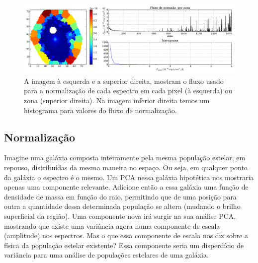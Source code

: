 \begin{figure}
    \includegraphics[width=1.\textwidth]{figuras/K0277-fobs_norm.pdf}
    \caption[Fluxos de normalização para cada zona da galáxia K0277.]
    {A imagem à esquerda e a superior direita, mostram o fluxo usado para a normalização de cada espectro em
    cada pixel (à esquerda) ou zona (superior direita). Na imagem inferior direita temos um histograma para valores do
    fluxo de normalização.}
    \label{fig:UsoPCA:K277fobsnorm}
\end{figure}

\subsection{Normalização}
\label{sec	:UsoPCA:PCAlidades:norm}

Imagine uma galáxia composta inteiramente pela mesma população estelar, em repouso, distribuídas da mesma maneira no
espaço. Ou seja, em qualquer ponto da galáxia o espectro é o mesmo. Um PCA nessa galáxia hipotética nos mostraria apenas
uma componente relevante. Adicione então a essa galáxia uma função de densidade de massa em função do raio, permitindo
que de uma posição para outra a quantidade dessa determinada população se altera (mudando o brilho superficial da
região). Uma componente nova irá surgir na sua análise PCA, mostrando que existe uma variância agora numa componente de
escala (amplitude) nos espectros. Mas o que essa componente de escala nos diz sobre a física da população estelar
existente? Essa componente seria um disperdício de variância para uma análise de populações estelares de uma galáxia.

